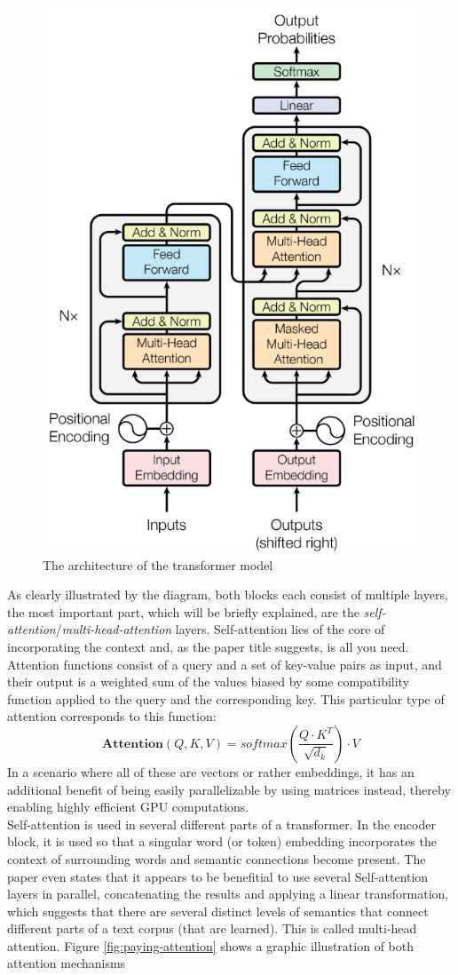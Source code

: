 \documentclass[draft,final]{vutinfth} %
\begin{document}
\begin{figure}
    \centering
    \includegraphics[width=0.6\linewidth]{thesis-figures/Transformer-Architecture.png}
    \caption{The architecture of the transformer model \cite[p. 3]{vaswani_attention_2017}}
    \label{fig:transformer-architecture}
\end{figure}As clearly illustrated by the diagram, both blocks each consist of multiple layers, the most important part, which will be briefly explained, are the \textit{self-attention}/\textit{multi-head-attention} layers. Self-attention lies of the core of incorporating the context and, as the paper title suggests, is all you need. Attention functions consist of a query and a set of key-value pairs as input, and their output is a weighted sum of the values biased by some compatibility function applied to the query and the corresponding key. This particular type of attention corresponds to this function: 
$$\mathbf{Attention}(Q,K,V) = softmax(\frac{Q \cdot K^T}{\sqrt{d_k}}) \cdot V$$
In a scenario where all of these are vectors or rather embeddings, it has an additional benefit of being easily parallelizable by using matrices instead, thereby enabling highly efficient GPU computations.\\
Self-attention is used in several different parts of a transformer. In the encoder block, it is used so that a singular word (or token) embedding incorporates the context of surrounding words and semantic connections become present. The paper even states that it appears to be benefitial to use several Self-attention layers in parallel, concatenating the results and applying a linear transformation, which suggests that there are several distinct levels of semantics that connect different parts of a text corpus (that are learned). This is called multi-head attention. Figure \ref{fig:paying-attention} shows a graphic illustration of both attention mechanisms
\end{document}
